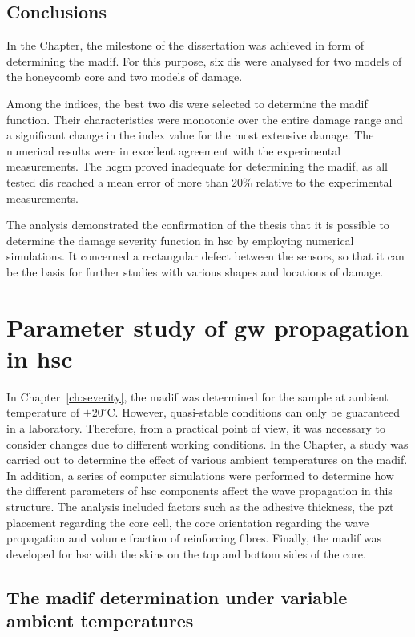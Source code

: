 \documentclass[11pt,a4paper,final]{report}
\theoremstyle{plain}
\begin{document}
\section{Conclusions}
\label{sec:conclusionsSever}
In the Chapter, the milestone of the dissertation was achieved in form of determining the \ac{madif}.
For this purpose, six \acp{di} were analysed for two models of the honeycomb core and two models of damage.

Among the indices, the best two \acp{di} were selected to determine the \ac{madif} function.
Their characteristics were monotonic over the entire damage range and a significant change in the index value for the most extensive damage.
The numerical results were in excellent agreement with the experimental measurements.
The \ac{hcgm} proved inadequate for determining the \ac{madif}, as all tested \acp{di} reached a mean error of more than 20\% relative to the experimental measurements.

The analysis demonstrated the confirmation of the thesis that it is possible to determine the damage severity function in \ac{hsc} by employing numerical simulations.
It concerned a rectangular defect between the sensors, so that it can be the basis for further studies with various shapes and locations of damage.\clearpage{}
\clearpage{}

\chapter{Parameter study of \acl{gw} propagation in \acl{hsc}}
\label{ch:tempEffects}

In Chapter~\ref{ch:severity}, the \ac{madif} was determined for the sample at ambient temperature of \(+20^{\circ}\)C.
However, quasi-stable conditions can only be guaranteed in a laboratory.
Therefore, from a practical point of view, it was necessary to consider changes due to different working conditions.
In the Chapter, a study was carried out to determine the effect of various ambient temperatures on the \ac{madif}.
In addition, a series of computer simulations were performed to determine how the different parameters of \ac{hsc} components affect the wave propagation in this structure.
The analysis included factors such as the adhesive thickness, the \ac{pzt} placement regarding the core cell, the core orientation regarding the wave propagation and volume fraction of reinforcing fibres.
Finally, the \ac{madif} was developed for \ac{hsc} with the skins on the top and bottom sides of the core.
\section{The \acl{madif} determination under variable ambient temperatures}
\label{sec:madifTemp}
\end{document}
